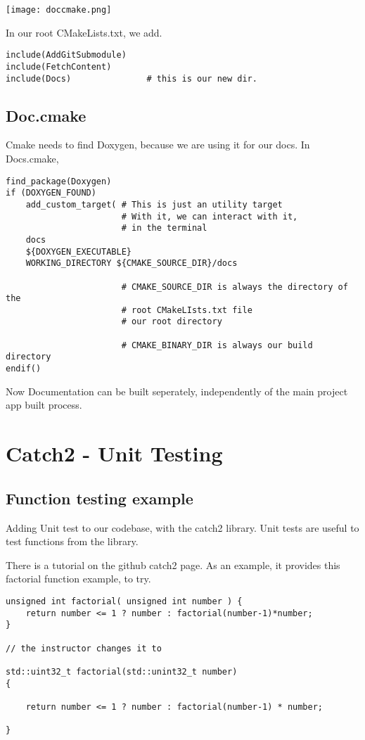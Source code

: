 \begin{center}
    \texttt{[image: doccmake.png]}
\end{center}

In our root CMakeLists.txt, we add.

\begin{verbatim}
include(AddGitSubmodule)
include(FetchContent)
include(Docs)               # this is our new dir.

\end{verbatim}


\subsection{Doc.cmake}

Cmake needs to find Doxygen, because we are using it for our docs. In Docs.cmake,

\begin{verbatim}
find_package(Doxygen)
if (DOXYGEN_FOUND)
    add_custom_target( # This is just an utility target
                       # With it, we can interact with it, 
                       # in the terminal
    docs
    ${DOXYGEN_EXECUTABLE}
    WORKING_DIRECTORY ${CMAKE_SOURCE_DIR}/docs

                       # CMAKE_SOURCE_DIR is always the directory of the
                       # root CMakeLIsts.txt file
                       # our root directory

                       # CMAKE_BINARY_DIR is always our build directory
endif()
\end{verbatim}

Now Documentation can be built seperately, independently of the main project app built process.

\section{Catch2 - Unit Testing}

\subsection{Function testing example}

Adding Unit test to our codebase, with the catch2 library. Unit tests are useful to test functions from the library.

There is a tutorial on the github catch2 page. As an example, it provides this factorial function example, to try.


\begin{verbatim}
unsigned int factorial( unsigned int number ) {
    return number <= 1 ? number : factorial(number-1)*number;
}

// the instructor changes it to

std::uint32_t factorial(std::unint32_t number)
{

    return number <= 1 ? number : factorial(number-1) * number;

}
\end{verbatim}


